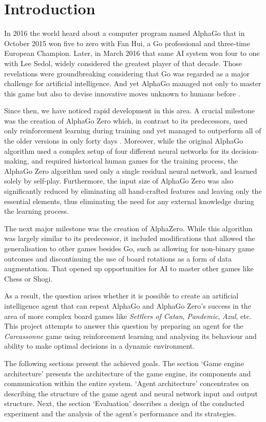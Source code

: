 \section{Introduction}
\label{chap:introduction}

In 2016 the world heard about a computer program named AlphaGo that in October 2015
won five to zero with Fan Hui, a Go professional and three-time European Champion. Later,
in March 2016 that same AI system won four to one with Lee Sedol, widely considered the
greatest player of that decade. Those revelations were groundbreaking considering that Go
was regarded as a major challenge for artificial intelligence. And yet AlphaGo managed not
only to master this game but also to devise innovative moves unknown to humans before \cite{AlphaGoBlog}.

Since then, we have noticed rapid development in this area. A crucial milestone was
the creation of AlphaGo Zero which, in contrast to its predecessors, used only reinforcement
learning during training and yet managed to outperform all of the older versions in only forty
days \cite{AlphaGoZeroBlog}. Moreover, while the original AlphaGo algorithm used a complex setup
of four different neural networks for its decision-making, and required historical human games
for the training process, the AlphaGo Zero algorithm used only a single residual neural network,
and learned solely by self-play. Furthermore, the input size of AlphaGo Zero was also significantly
reduced by eliminating all hand-crafted features and leaving only the essential elements,
thus eliminating the need for any external knowledge during the learning process.

The next major milestone was the creation of AlphaZero. While this algorithm was largely similar
to its predecessor, it included modifications that allowed the generalisation to other games besides Go,
such as allowing for non-binary game outcomes and discontinuing the use of board rotations as a form of
data augmentation. That opened up opportunities for AI to master other games like Chess or Shogi.

As a result, the question arises whether it is possible to create an artificial intelligence
agent that can repeat AlphaGo and AlphaGo Zero's success in the area of more complex
board games like \textit{Settlers of Catan}, \textit{Pandemic}, \textit{Azul}, etc. This 
project attempts to answer this question by preparing an agent for the \textit{Carcassonne} game 
using reinforcement learning and analysing its behaviour and ability to make optimal 
decisions in a dynamic environment.

The following sections present the achieved goals. The section `Game engine architecture' 
presents the architecture of the game engine, its components and communication within the entire system. `Agent architecture' 
concentrates on describing the structure of the game agent and neural network input and
output structure. Next, the section `Evaluation' describes a design of the conducted experiment 
and the analysis of the agent's performance and its strategies.
